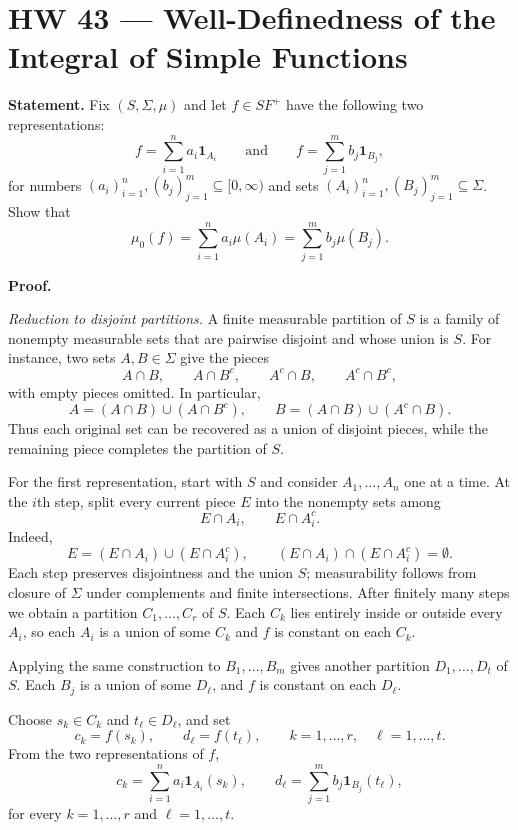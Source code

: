 \documentclass[10pt,a4paper]{article}
\begin{document}
\section*{\textcolor{PFFBlue}{HW 43 --- Well-Definedness of the Integral of Simple Functions}}

\textbf{Statement.} Fix $(S,\Sigma,\mu)$ and let $f\in SF^+$ have the following two representations:
\[
f=\sum_{i=1}^{n}a_i\mathbf1_{A_i}
\qquad\text{and}\qquad
f=\sum_{j=1}^{m}b_j\mathbf1_{B_j},
\]
for numbers $(a_i)_{i=1}^{n},(b_j)_{j=1}^{m}\subseteq[0,\infty)$ and sets
$(A_i)_{i=1}^{n},(B_j)_{j=1}^{m}\subseteq\Sigma$. Show that
\[
\mu_0(f)=\sum_{i=1}^{n}a_i\mu(A_i)
=\sum_{j=1}^{m}b_j\mu(B_j).
\]

\medskip
\textbf{\textcolor{PFFBlue}{Proof.}}

\textit{Reduction to disjoint partitions.}
A finite measurable partition of $S$ is a family of nonempty measurable sets that are pairwise disjoint and whose union is $S$. For instance, two sets $A,B\in\Sigma$ give the pieces
\[
A\cap B,\qquad A\cap B^c,\qquad A^c\cap B,\qquad A^c\cap B^c,
\]
with empty pieces omitted. In particular,
\[
A=(A\cap B)\cup(A\cap B^c),\qquad
B=(A\cap B)\cup(A^c\cap B).
\]
Thus each original set can be recovered as a union of disjoint pieces, while the remaining piece completes the partition of $S$.

For the first representation, start with $S$ and consider $A_1,\ldots,A_n$ one at a time. At the $i$th step, split every current piece $E$ into the nonempty sets among
\[
E\cap A_i,\qquad E\cap A_i^c.
\]
Indeed,
\[
E=(E\cap A_i)\cup(E\cap A_i^c),\qquad
(E\cap A_i)\cap(E\cap A_i^c)=\emptyset.
\]
Each step preserves disjointness and the union $S$; measurability follows from closure of $\Sigma$ under complements and finite intersections. After finitely many steps we obtain a partition $C_1,\ldots,C_r$ of $S$. Each $C_k$ lies entirely inside or outside every $A_i$, so each $A_i$ is a union of some $C_k$ and $f$ is constant on each $C_k$.

Applying the same construction to $B_1,\ldots,B_m$ gives another partition $D_1,\ldots,D_t$ of $S$. Each $B_j$ is a union of some $D_\ell$, and $f$ is constant on each $D_\ell$.

Choose $s_k\in C_k$ and $t_\ell\in D_\ell$, and set
\[
c_k=f(s_k),\qquad d_\ell=f(t_\ell),
\qquad k=1,\ldots,r,\quad \ell=1,\ldots,t.
\]
From the two representations of $f$,
\[
c_k=\sum_{i=1}^{n}a_i\mathbf1_{A_i}(s_k),\qquad
d_\ell=\sum_{j=1}^{m}b_j\mathbf1_{B_j}(t_\ell),
\]
for every $k=1,\ldots,r$ and $\ell=1,\ldots,t$.
\end{document}
